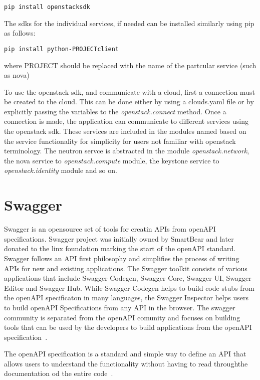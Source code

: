 \begin{verbatim}
pip install openstacksdk
\end{verbatim}

The sdks for the individual services, if needed can be installed
similarly using pip as follows:

\begin{verbatim}
pip install python-PROJECTclient
\end{verbatim}

where PROJECT should be replaced with the name of the partcular
service (such as nova)

To use the openstack sdk, and communicate with a cloud, first a
connection must be created to the cloud. This can be done either by
using a clouds.yaml file or by explicitly passing the variables to
the \emph{openstack.connect\(\)} method. Once a connection is made, the
application can communicate to different services using the openstack
sdk. These services are included in the modules named based on the
service functionality for simplicity for users not familiar with
openstack terminology. The neutron servce is abstracted in the
module \emph{openstack.network}, the nova service
to \emph{openstack.compute} module, the keystone service
to \emph{openstack.identity} module and so on.

\section{Swagger}
Swagger is an opensource set of tools for creatin APIs from openAPI
specifications. Swagger project was initially owned by SmartBear and
later donated to the linx foundation marking the start of the openAPI
standard. Swagger follows an API first philosophy and simplifies the
process of writing APIs for new and existing applications.
The Swagger
toolkit consists of various applications that include Swagger Codegen,
Swagger Core, Swagger UI, Swagger Editor and Swagger Hub. While
Swagger Codegen helps to build code stubs from the openAPI
specificaton in many languages, the Swagger Inspector helps users to build
openAPI Specifications from any API in the browser.
The swagger community is separated from the openAPI comunity and
focuses on building tools that can be used by the developers to build
applications from the openAPI specification~\cite{hid-sp18-503-swagger}.

The openAPI specification is a standard and simple way to define an
API that allows users to understand the functionality without having
to read throughthe documentation od the entire
code~\cite{hid-sp18-503-swagger-openapi}.

